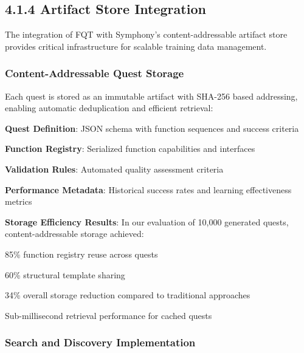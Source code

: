 \subsection*{4.1.4 Artifact Store Integration}

The integration of FQT with Symphony's content-addressable artifact store provides critical infrastructure for scalable training data management.

\subsubsection*{Content-Addressable Quest Storage}

Each quest is stored as an immutable artifact with SHA-256 based addressing, enabling automatic deduplication and efficient retrieval:

\begin{compactlist}
    \item \textbf{Quest Definition}: JSON schema with function sequences and success criteria
    \item \textbf{Function Registry}: Serialized function capabilities and interfaces
    \item \textbf{Validation Rules}: Automated quality assessment criteria
    \item \textbf{Performance Metadata}: Historical success rates and learning effectiveness metrics
\end{compactlist}

\begin{successbox}
\textbf{Storage Efficiency Results}:
In our evaluation of 10,000 generated quests, content-addressable storage achieved:
\begin{compactlist}
    \item 85\% function registry reuse across quests
    \item 60\% structural template sharing
    \item 34\% overall storage reduction compared to traditional approaches
    \item Sub-millisecond retrieval performance for cached quests
\end{compactlist}
\end{successbox}

\subsubsection*{Search and Discovery Implementation}


